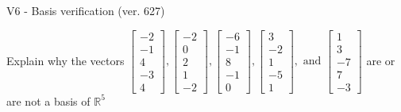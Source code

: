 \begin{exercise}
  \begin{exerciseTitle}V6 - Basis verification (ver. 627)\end{exerciseTitle}
  \begin{exerciseStatement}
    Explain why the vectors \(\left[\begin{array}{r}
-2 \\
-1 \\
4 \\
-3 \\
4
\end{array}\right] , \left[\begin{array}{r}
-2 \\
0 \\
2 \\
1 \\
-2
\end{array}\right] , \left[\begin{array}{r}
-6 \\
-1 \\
8 \\
-1 \\
0
\end{array}\right] , \left[\begin{array}{r}
3 \\
-2 \\
1 \\
-5 \\
1
\end{array}\right] , \text{ and } \left[\begin{array}{r}
1 \\
3 \\
-7 \\
7 \\
-3
\end{array}\right]\) are or are not a basis of \(\mathbb{R}^5\)	



\end{exerciseStatement}
\end{exercise}
